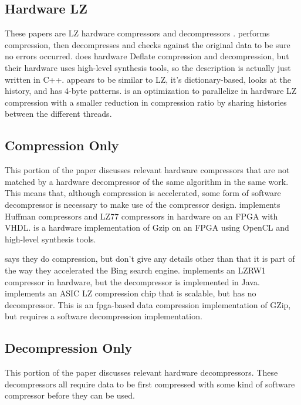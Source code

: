 \documentclass[doublespace,draft,nopageskip]{VTthesis} %
\begin{document}
\subsection{Hardware LZ}\label{ss:hardware_lz}
These papers are LZ hardware compressors and decompressors \cite{lz77fpga, lzfpga}.  \cite{lzfpga} performs compression, then decompresses and checks against the original data to be sure no errors occurred. \cite{highthroughputdeflate} does hardware Deflate compression and decompression, but their hardware uses high-level synthesis tools, so the description is actually just written in C++. \cite{xmatchpro} appears to be similar to LZ, it's dictionary-based, looks at the history, and has 4-byte patterns. \cite{ibmoptimization} is an optimization to parallelize in hardware LZ compression with a smaller reduction in compression ratio by sharing histories between the different threads.

\subsection{Compression Only}\label{ss:compression_only}
This portion of the paper discusses relevant hardware compressors that are not matched by a hardware decompressor of the same algorithm in the same work. This means that, although compression is accelerated, some form of software decompressor is necessary to make use of the compressor design. \cite{fpgahuffmanlz77} implements Huffman compressors and LZ77 compressors in hardware on an FPGA with VHDL.  \cite{gziponachip} is a hardware implementation of Gzip on an FPGA using OpenCL and high-level synthesis tools.

\cite{acceleratingdatacenter} says they do compression, but don't give any details other than that it is part of the way they accelerated the Bing search engine. \cite{lzrw1} implements an LZRW1 compressor in hardware, but the decompressor is implemented in Java. \cite{lzvlsi} implements an ASIC LZ compression chip that is scalable, but has no decompressor. \cite{fpgagzip} This is an fpga-based data compression implementation of GZip, but requires a software decompression implementation.

\subsection{Decompression Only}\label{ss:decompression_only}
This portion of the paper discusses relevant hardware decompressors. These decompressors all require data to be first compressed with some kind of software compressor before they can be used.
\end{document}
